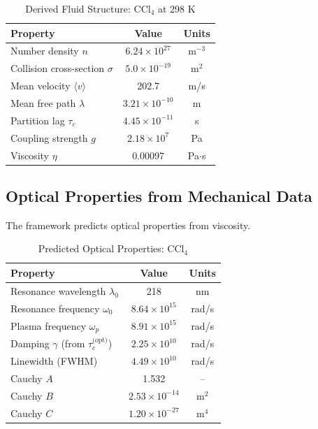 \documentclass[twocolumn,10pt]{article}
\theoremstyle{definition}
\theoremstyle{remark}
\begin{document}
\begin{table}[h]
\centering
\caption{Derived Fluid Structure: CCl$_4$ at 298 K}
\label{tab:structure}
\begin{tabular}{lcc}
\toprule
\textbf{Property} & \textbf{Value} & \textbf{Units} \\
\midrule
Number density $n$ & $6.24 \times 10^{27}$ & m$^{-3}$ \\
Collision cross-section $\sigma$ & $5.0 \times 10^{-19}$ & m$^2$ \\
Mean velocity $\langle v \rangle$ & 202.7 & m/s \\
Mean free path $\lambda$ & $3.21 \times 10^{-10}$ & m \\
Partition lag $\tau_c$ & $4.45 \times 10^{-11}$ & s \\
Coupling strength $g$ & $2.18 \times 10^{7}$ & Pa \\
Viscosity $\eta$ & 0.00097 & Pa$\cdot$s \\
\bottomrule
\end{tabular}
\end{table}

\subsection{Optical Properties from Mechanical Data}

The framework predicts optical properties from viscosity.

\begin{table}[h]
\centering
\caption{Predicted Optical Properties: CCl$_4$}
\label{tab:optical}
\begin{tabular}{lcc}
\toprule
\textbf{Property} & \textbf{Value} & \textbf{Units} \\
\midrule
Resonance wavelength $\lambda_0$ & 218 & nm \\
Resonance frequency $\omega_0$ & $8.64 \times 10^{15}$ & rad/s \\
Plasma frequency $\omega_p$ & $8.91 \times 10^{15}$ & rad/s \\
Damping $\gamma$ (from $\tau_c^{\text{(opt)}}$) & $2.25 \times 10^{10}$ & rad/s \\
Linewidth (FWHM) & $4.49 \times 10^{10}$ & rad/s \\
Cauchy $A$ & 1.532 & -- \\
Cauchy $B$ & $2.53 \times 10^{-14}$ & m$^2$ \\
Cauchy $C$ & $1.20 \times 10^{-27}$ & m$^4$ \\
\bottomrule
\end{tabular}
\end{table}
\end{document}
